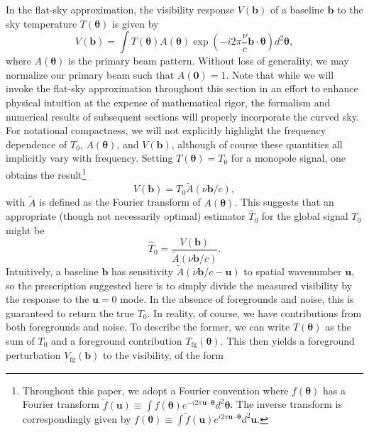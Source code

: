 \documentclass[twocolumn,apj,numberedappendix]{emulateapj}
\begin{document}
In the flat-sky approximation, the visibility response $V(\mathbf{b})$ of a baseline $\mathbf{b}$ to the sky temperature $T(\boldsymbol \theta)$ is given by
\begin{equation}
\label{eq:Vb}
V(\mathbf{b}) = \int  T(\boldsymbol \theta) A(\boldsymbol \theta) \exp \left( -i 2 \pi \frac{\nu}{c} \mathbf{b} \cdot \boldsymbol \theta \right) d^2 \mathbf{\theta},
\end{equation}
where $ A(\boldsymbol \theta)$ is the primary beam pattern.  Without loss of generality, we may normalize our primary beam such that $A(\mathbf{0}) = 1$.  Note that while we will invoke the flat-sky approximation throughout this section in an effort to enhance physical intuition at the expense of mathematical rigor, the formalism and numerical results of subsequent sections will properly incorporate the curved sky. For notational compactness, we will not explicitly highlight the frequency dependence of $T_0$, $A(\boldsymbol{\theta})$, and $V(\mathbf{b})$, although of course these quantities all implicitly vary with frequency. Setting $T(\boldsymbol \theta) = T_0$ for a monopole signal, one obtains the result\footnote{Throughout this paper, we adopt a Fourier convention where $f(\boldsymbol \theta)$ has a Fourier transform $\widetilde{f}(\mathbf{u}) \equiv \int f(\boldsymbol \theta) e^{-i 2 \pi \mathbf{u} \cdot \boldsymbol \theta  } d^2 \boldsymbol \theta$. The inverse transform is correspondingly given by $f(\boldsymbol \theta) \equiv \int \widetilde{f}(\mathbf{u}) e^{i 2 \pi \mathbf{u} \cdot \boldsymbol \theta  }d^2 \mathbf{u}$.}
\begin{equation}
\label{eq:blMonoResponse}
V(\mathbf{b}) = T_0 \widetilde{A} \left( \nu \mathbf{b} / c \right),
\end{equation}
with $\widetilde{A}$ is defined as the Fourier transform of $A(\boldsymbol \theta)$.  This suggests that an appropriate (though not necessarily optimal) estimator $\widehat{T}_0$ for the global signal $T_0$ might be
\begin{equation}
\label{eq:singleBlSillyEst}
\widehat{T}_0 = \frac{V( \mathbf{b})}{\widetilde{A} \left( \nu \mathbf{b} / c \right)}.
\end{equation}
Intuitively, a baseline $\mathbf{b}$ has sensitivity $\widetilde{A} \left( \nu \mathbf{b} / c - \mathbf{u} \right)$ to spatial wavenumber $\mathbf{u}$, so the prescription suggested here is to simply divide the measured visibility by the response to the $\mathbf{u}=0$ mode. In the absence of foregrounds and noise, this is guaranteed to return the true $T_0$.  In reality, of course, we have contributions from both foregrounds and noise.  To describe the former, we can write $T(\boldsymbol \theta)$ as the sum of $T_0$ and a foreground contribution $T_\textrm{fg} (\boldsymbol \theta)$.  This then yields a foreground perturbation $V_\textrm{fg} (\mathbf{b})$ to the visibility, of the form
\end{document}
